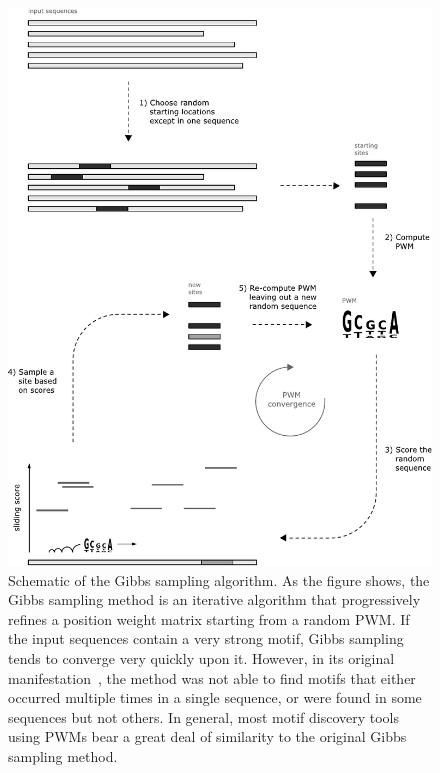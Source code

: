 \begin{figure}[ptb]
\centering
\includegraphics[height=0.80\textheight]{Body/Images-chap1/gibbs.pdf}
\caption[Schematic of the Gibbs sampling algorithm]{Schematic of the
Gibbs sampling algorithm.  As the figure shows, the Gibbs sampling
method is an iterative algorithm that progressively refines a
position weight matrix starting from a random PWM\@.  If the input
sequences contain a very strong motif, Gibbs sampling tends to
converge very quickly upon it.  However, in its original
manifestation~\cite{lawrence1993detecting}, the method was not able
to find motifs that either occurred multiple times in a single
sequence, or were found in some sequences but not others.  In
general, most motif discovery tools using PWMs bear a great deal of
similarity to the original Gibbs sampling method.
 } \label{fig:gibbs}
\end{figure}

